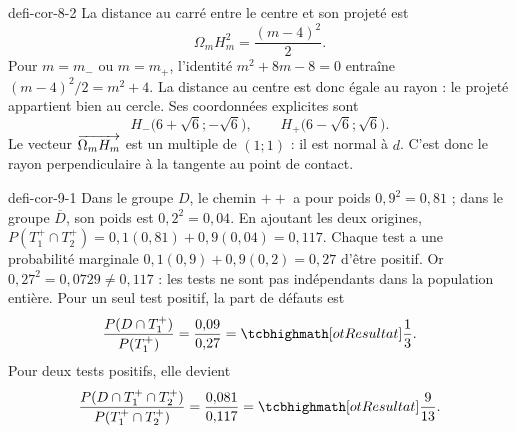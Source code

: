 \begin{blocEdition}{defi-cor-8-2}
La distance au carré entre le centre et son projeté est
\[\Omega_mH_m^2=\frac{(m-4)^2}{2}.\]
Pour $m=m_-$ ou $m=m_+$, l'identité $m^2+8m-8=0$ entraîne
$(m-4)^2/2=m^2+4$. La distance au centre est donc égale au rayon : le projeté
appartient bien au cercle. Ses coordonnées explicites sont
\[H_-\bigl(6+\sqrt6;-\sqrt6\bigr),\qquad
H_+\bigl(6-\sqrt6;\sqrt6\bigr).\]
Le vecteur $\overrightarrow{\Omega_mH_m}$ est un multiple de $(1;1)$ : il est normal à $d$.
C'est donc le rayon perpendiculaire à la tangente au point de contact.
\label{figedition-defi-cor-8-2-1}
\end{blocEdition}

\begin{blocEdition}{defi-cor-9-1}
Dans le groupe $D$, le chemin $++$ a pour poids $0{,}9^2=0{,}81$ ; dans le groupe
$\overline D$, son poids est $0{,}2^2=0{,}04$.
En ajoutant les deux origines, $P(T_1^+\cap T_2^+)=0{,}1(0{,}81)+0{,}9(0{,}04)=0{,}117$.
Chaque test a une probabilité marginale $0{,}1(0{,}9)+0{,}9(0{,}2)=0{,}27$ d'être positif.
Or $0{,}27^2=0{,}0729\ne0{,}117$ : les tests ne sont pas indépendants dans la population entière.
Pour un seul test positif, la part de défauts est
\[\frac{P(D\cap T_1^+)}{P(T_1^+)}=\frac{0{,}09}{0{,}27}=\res{\frac13}.\]
Pour deux tests positifs, elle devient
\[\frac{P(D\cap T_1^+\cap T_2^+)}{P(T_1^+\cap T_2^+)}
=\frac{0{,}081}{0{,}117}=\res{\frac9{13}}.\]
\label{figedition-defi-cor-9-1-1}
\end{blocEdition}

